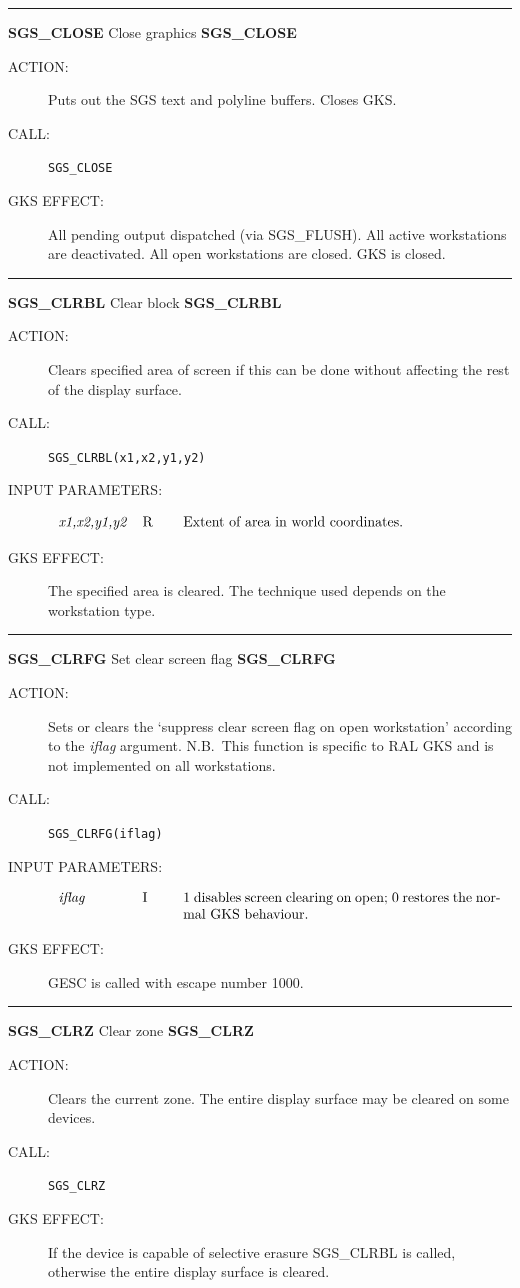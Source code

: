 \documentclass[11pt]{article}
\newcommand{\htmlref}[2]{#1}
\newcommand{\xlabel}[1]{}
\newcommand{\rthead}[2]{\rule{\textwidth}{0.3mm}
{\Large {\bf #1} \hfill #2 \hfill {\bf #1}}}
\newenvironment{params}%
{\[\begin{tabular}{p{0.14\textwidth}p{0.05\textwidth}p{0.66\textwidth}}}%
{\end{tabular}\]}
\newcommand{\rparams}[3]{{\em #1} &#2 &#3\\}
\newcommand{\rthead}[2]{\subsection{\label{#1}\xlabel{#1}#1 - #2}}
\newenvironment{params}{\begin{description}}{\end{description}}
\newcommand{\rparams}[3]{\item{{\em #1}} (#2) #3}
\begin{document}
\rthead{SGS\_CLOSE}{Close graphics}
\begin{description}
\item [ACTION:]
Puts out the SGS text and polyline buffers.
Closes GKS.
\item [CALL:]
{\tt SGS\_CLOSE}
\item [GKS EFFECT:]
All pending output dispatched (via \htmlref{SGS\_FLUSH}{SGS_FLUSH}).
All active workstations are deactivated.
All open workstations are closed.
GKS is closed.
\end{description}
\goodbreak

\rthead{SGS\_CLRBL}{Clear block}
\begin{description}
\item [ACTION:]
Clears specified area of screen if this can be done without affecting the rest
of the display surface.
\item [CALL:]
{\tt SGS\_CLRBL(x1,x2,y1,y2)}
\item [INPUT PARAMETERS:]
\begin{params}
\rparams{x1,x2,y1,y2}{R}{Extent of area in world coordinates.}
\end{params}
\item [GKS EFFECT:]
The specified area is cleared.
The technique used depends on the workstation type.
\end{description}
\goodbreak

\rthead{SGS\_CLRFG}{Set clear screen flag}
\begin{description}
\item [ACTION:]
Sets or clears the `suppress clear screen flag on open workstation' according
to the {\em iflag}\/ argument.
N.B.\ This function is specific to RAL GKS and is not implemented on all
workstations.
\item [CALL:]
{\tt SGS\_CLRFG(iflag)}
\item [INPUT PARAMETERS:]
\begin{params}
\rparams{iflag}{I}{1 disables screen clearing on open; 0 restores the normal
GKS behaviour.}
\end{params}
\item [GKS EFFECT:]
GESC is called with escape number 1000.
\end{description}
\goodbreak

\rthead{SGS\_CLRZ}{Clear zone}
\begin{description}
\item [ACTION:]
Clears the current zone.
The entire display surface may be cleared on some devices.
\item [CALL:]
{\tt SGS\_CLRZ}
\item [GKS EFFECT:]
If the device is capable of selective erasure 
\htmlref{SGS\_CLRBL}{SGS_CLRBL} is called, otherwise
the entire display surface is cleared.
\end{description}
\goodbreak
\end{document}
